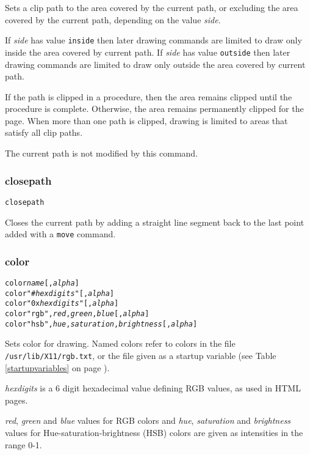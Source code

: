 Sets a clip path to the area covered by the current path,
or excluding the area covered by the current path, depending
on the value \textit{side}.

If \textit{side} has value \texttt{inside} then
later drawing commands are limited to draw only inside the area
covered by current path.
If \textit{side} has value \texttt{outside} then
later drawing commands are limited to draw only outside the area
covered by current path.

If the path is clipped in a procedure, then the area remains
clipped until the procedure is complete.  Otherwise, the area
remains permanently clipped for the page.
When more than one path is clipped, drawing is limited to
areas that satisfy all clip paths.

The current path is not modified by this command.

\subsubsection{closepath}

\begin{alltt}
closepath
\end{alltt}

Closes the current path by adding a straight line segment
back to the last point added with a \texttt{move} command.

\subsubsection{color}

\begin{alltt}
color \textit{name} [, \textit{alpha}]
color "\#\textit{hexdigits}" [, \textit{alpha}]
color "0x\textit{hexdigits}" [, \textit{alpha}]
color "rgb", \textit{red}, \textit{green}, \textit{blue} [, \textit{alpha}]
color "hsb", \textit{hue}, \textit{saturation}, \textit{brightness} [, \textit{alpha}]
\end{alltt}

Sets color for drawing.  Named colors refer to colors in the file
\texttt{/usr/lib/X11/rgb.txt}, or the file given as a startup variable (see
Table \ref{startupvariables} on page \pageref{startupvariables}).

\textit{hexdigits} is a 6 digit hexadecimal
value defining RGB values, as used in HTML pages.

\textit{red}, \textit{green} and \textit{blue} values for RGB colors and
\textit{hue}, \textit{saturation} and \textit{brightness} values for
Hue-saturation-brightness (HSB) colors are given as intensities in the range
0-1.

